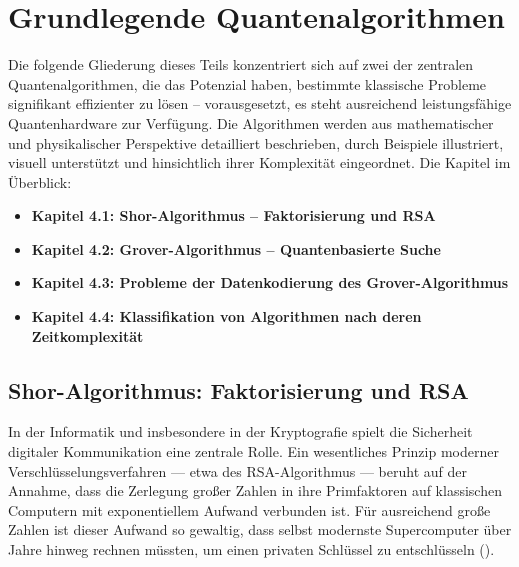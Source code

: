\chapter{Grundlegende Quantenalgorithmen}
\label{basic_algorithms} %



\abstract{}
Die folgende Gliederung dieses Teils konzentriert sich auf zwei der zentralen Quantenalgorithmen, die das Potenzial haben, bestimmte klassische Probleme signifikant effizienter zu lösen – vorausgesetzt, es steht ausreichend leistungsfähige Quantenhardware zur Verfügung. Die Algorithmen werden aus mathematischer und physikalischer Perspektive detailliert beschrieben, durch Beispiele illustriert, visuell unterstützt und hinsichtlich ihrer Komplexität eingeordnet. Die Kapitel im Überblick:

\begin{itemize}
\item \textbf{Kapitel 4.1: Shor-Algorithmus – Faktorisierung und RSA}
\item \textbf{Kapitel 4.2: Grover-Algorithmus – Quantenbasierte Suche}
\item \textbf{Kapitel 4.3: Probleme der Datenkodierung des Grover-Algorithmus}
\item \textbf{Kapitel 4.4: Klassifikation von Algorithmen nach deren Zeitkomplexität}
\end{itemize}

\section{Shor-Algorithmus: Faktorisierung und RSA}

In der Informatik und insbesondere in der Kryptografie spielt die Sicherheit digitaler Kommunikation eine zentrale Rolle. Ein wesentliches Prinzip moderner Verschlüsselungsverfahren — etwa des RSA-Algorithmus — beruht auf der Annahme, dass die Zerlegung großer Zahlen in ihre Primfaktoren auf klassischen Computern mit exponentiellem Aufwand verbunden ist. Für ausreichend große Zahlen ist dieser Aufwand so gewaltig, dass selbst modernste Supercomputer über Jahre hinweg rechnen müssten, um einen privaten Schlüssel zu entschlüsseln (\cite[]{milanov_rsa_2009}).\\

